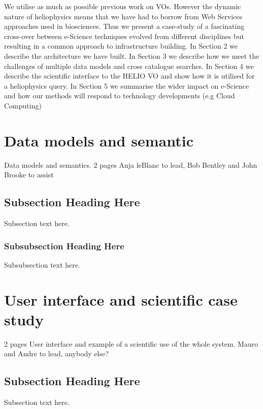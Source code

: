 \documentclass[conference]{IEEEtran}
\begin{document}
 We utilise as much as possible previous work on VOs. However the dynamic nature of heliophysics means that we have had to borrow from Web Services approaches
used in biosciences. Thus we present a case-study of a fascinating cross-over
between e-Science techniques evolved from different disciplines but resulting
in a common approach to infrastructure building. In Section 2 we describe 
the architecture we have built. In Section 3 we describe how we meet the 
challenges of multiple data models and cross catalogue searches. In Section
4 we describe the scientific interface to the HELIO VO and show how it is 
utilised for a heliophysics query. In Section 5 we summarise the wider impact 
on e-Science and how our methods will respond to technology developments 
(e.g Cloud Computing)






\section{Data models and semantic}
Data models and semantics. 2 pages Anja leBlanc to lead, Bob Bentley and John Brooke to assist 
\subsection{Subsection Heading Here}
Subsection text here.
\subsubsection{Subsubsection Heading Here}
Subsubsection text here.

\section{User interface and scientific case study}
2 pages User interface and example of a scientific use of the whole system. Mauro and Andre to lead, anybody else? 
\subsection{Subsection Heading Here}
Subsection text here.
\end{document}
